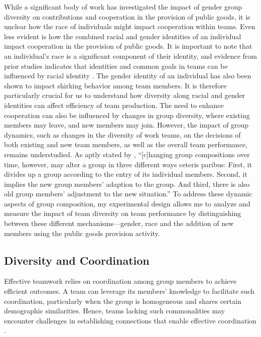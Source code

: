 \hspace *{0mm} While a significant body of work has investigated the impact of gender group diversity on contributions and cooperation in the provision of public goods, it is unclear how the race of individuals might impact cooperation within teams. Even less evident is how the combined racial and gender identities of an individual impact cooperation in the provision of public goods. It is important to note that an individual’s race is a significant component of their identity, and evidence from prior studies indicates that identities and common goals in teams can be influenced by racial identity \citep{burns2015}. The gender identity of an individual has also been shown to impact shirking behavior among team members. It is therefore particularly crucial for us to understand how diversity along racial and gender identities can affect efficiency of team production. The need to enhance cooperation can also be influenced by changes in group diversity, where existing members may leave, and new members may join. However, the impact of group dynamics, such as changes in the diversity of work teams, on the decisions of both existing and new team members, as well as the overall team performance, remains understudied. As aptly stated by \cite{ght18}, “[c]hanging group compositions over time, however, may alter a group in three different ways ceteris paribus: First, it divides up a group according to the entry of its individual members. Second, it implies the new group members’ adaption to the group. And third, there is also old group members’ adjustment to the new situation.” To address these dynamic aspects of group composition, my experimental design allows me to analyze and measure the impact of team diversity on team performance by distinguishing between these different mechanisms---gender, race and the addition of new members using the public goods provision activity. 

\subsection{Diversity and Coordination }

\hspace{0mm} Effective teamwork relies on coordination among group members to achieve efficient outcomes. A team can leverage its members' knowledge to facilitate such coordination, particularly when the group is homogeneous and shares certain demographic similarities. Hence, teams lacking such commonalities may encounter challenges in establishing connections that enable effective coordination \citep{pk12}. 

